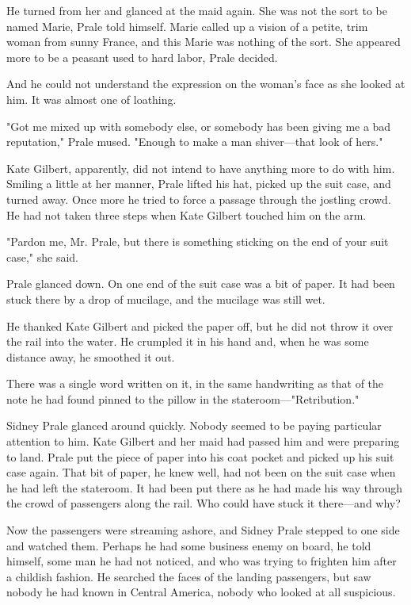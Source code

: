 \documentclass{novel}
\begin{document}
He turned from her and glanced at the maid again. She was not the sort to be named Marie, Prale told himself. Marie called up a vision of a petite, trim woman from sunny France, and this Marie was nothing of the sort. She appeared more to be a peasant used to hard labor, Prale decided.

And he could not understand the expression on the woman's face as she looked at him. It was almost one of loathing.

"Got me mixed up with somebody else, or somebody has been giving me a bad reputation," Prale mused. "Enough to make a man shiver---that look of hers."

Kate Gilbert, apparently, did not intend to have anything more to do with him. Smiling a little at her manner, Prale lifted his hat, picked up the suit case, and turned away. Once more he tried to force a passage through the jostling crowd. He had not taken three steps when Kate Gilbert touched him on the arm.

"Pardon me, Mr. Prale, but there is something sticking on the end of your suit case," she said.

Prale glanced down. On one end of the suit case was a bit of paper. It had been stuck there by a drop of mucilage, and the mucilage was still wet.

He thanked Kate Gilbert and picked the paper off, but he did not throw it over the rail into the water. He crumpled it in his hand and, when he was some distance away, he smoothed it out.

There was a single word written on it, in the same handwriting as that of the note he had found pinned to the pillow in the stateroom---"Retribution."

Sidney Prale glanced around quickly. Nobody seemed to be paying particular attention to him. Kate Gilbert and her maid had passed him and were preparing to land. Prale put the piece of paper into his coat pocket and picked up his suit case again. That bit of paper, he knew well, had not been on the suit case when he had left the stateroom. It had been put there as he had made his way through the crowd of passengers along the rail. Who could have stuck it there---and why?

Now the passengers were streaming ashore, and Sidney Prale stepped to one side and watched them. Perhaps he had some business enemy on board, he told himself, some man he had not noticed, and who was trying to frighten him after a childish fashion. He searched the faces of the landing passengers, but saw nobody he had known in Central America, nobody who looked at all suspicious.
\end{document}
